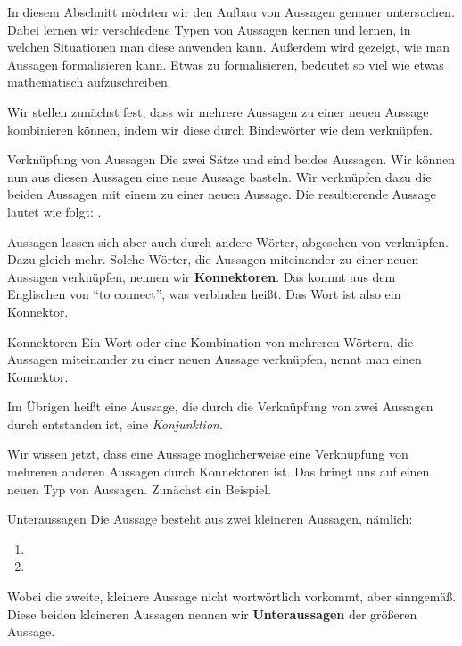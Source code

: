 \documentclass[../../main.tex]{subfiles}
\begin{document}
In diesem Abschnitt möchten wir den Aufbau von Aussagen genauer untersuchen. 
Dabei lernen wir verschiedene Typen von Aussagen kennen und lernen, 
in welchen Situationen man diese anwenden kann. Außerdem wird gezeigt, 
wie man Aussagen formalisieren kann. Etwas zu formalisieren, bedeutet so 
viel wie etwas mathematisch aufzuschreiben.

Wir stellen zunächst fest, dass wir mehrere Aussagen zu einer neuen Aussage kombinieren können, indem wir diese durch Bindewörter wie dem  verknüpfen.
\begin{example}{Verknüpfung von Aussagen}
    Die zwei Sätze
     und 
    sind beides Aussagen. Wir können nun aus diesen Aussagen eine neue Aussage basteln. Wir verknüpfen dazu die beiden Aussagen mit einem  zu einer neuen Aussage. Die resultierende Aussage lautet wie folgt: .
\end{example}

Aussagen lassen sich aber auch durch andere Wörter, abgesehen von  verknüpfen. Dazu gleich mehr. Solche Wörter, die Aussagen miteinander zu einer neuen Aussagen verknüpfen, nennen wir \textbf{Konnektoren}. Das kommt aus dem Englischen von \enquote{to connect}, was verbinden heißt. Das Wort  ist also ein Konnektor.

\begin{definition}{Konnektoren}
Ein Wort oder eine Kombination von mehreren Wörtern, die Aussagen miteinander zu einer neuen Aussage verknüpfen, nennt man einen Konnektor.
\end{definition}

Im Übrigen heißt eine Aussage, die durch die Verknüpfung von zwei Aussagen durch 
entstanden ist, eine \textit{Konjunktion}.

Wir wissen jetzt, dass eine Aussage möglicherweise eine Verknüpfung von mehreren
anderen Aussagen durch Konnektoren ist. Das bringt uns auf einen neuen Typ von Aussagen.
Zunächst ein Beispiel.
\begin{example}{Unteraussagen}
Die Aussage  besteht aus zwei kleineren Aussagen, nämlich:
\begin{enumerate}
    \item {}
    \item {}
\end{enumerate}
Wobei die zweite, kleinere Aussage nicht wortwörtlich vorkommt, aber sinngemäß.
Diese beiden kleineren Aussagen nennen wir \textbf{Unteraussagen} der größeren Aussage.
\end{example}
\end{document}
